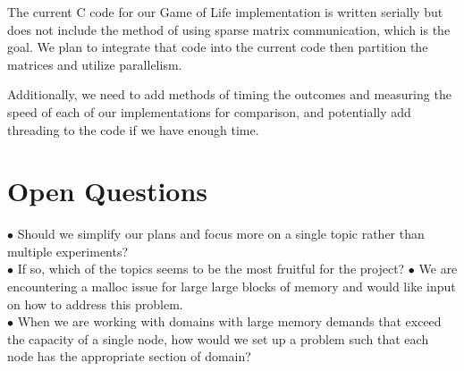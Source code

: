 \documentclass[12pt]{article}
\begin{document}
The current C code for our Game of Life implementation is written serially but does not include the 
method of using sparse matrix communication, which is the goal. We plan to integrate that code into the 
current code then partition the matrices and utilize parallelism.\\ \par
Additionally, we need to add methods of timing the outcomes and measuring the speed of each of our implementations for comparison, and potentially add threading to the code if we
have enough time. \par

\section{Open Questions}
$\bullet$ Should we simplify our plans and focus more on a single topic rather than multiple experiments?\\
$\bullet$ If so, which of the topics seems to be the most fruitful for the project?
$\bullet$ We are encountering a malloc issue for large large blocks of memory and would like input on how to address this problem. \\
$\bullet$ When we are working with domains with large memory demands that exceed the capacity of a single node, how would we set up a problem such that each node has the appropriate section of domain?

\printbibliography[
heading=bibintoc,
title={References}
]
\end{document}
